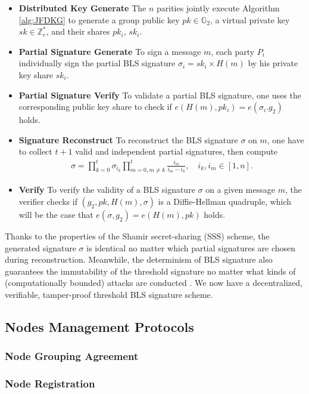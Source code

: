 \documentclass[11pt]{article}
\begin{document}
\begin{itemize}
    \item[] \textbf{Distributed Key Generate} The $n$ parities jointly execute Algorithm \ref{alg:JFDKG} to generate a group public key $pk \in \mathbb{G}_2$, a virtual private key $sk \in \mathbb{Z}_r^*$, and their shares $pk_i$, $sk_i$.
    \item[] \textbf{Partial Signature Generate} To sign a message $m$, each party $P_i$ individually sign the partial BLS signature $\sigma_i=sk_i \times H(m)$ by his private key share $sk_i$.
    \item[] \textbf{Partial Signature Verify} To validate a partial BLS signature, one uses the corresponding public key share to check if $e(H(m),pk_i)=e(\sigma_i.g_2)$ holds.
    \item[] \textbf{Signature Reconstruct} To reconstruct the BLS signature $\sigma$ on $m$, one have to collect $t+1$ valid and independent partial signatures, then compute
    \begin{align*}
        \sigma = \prod_{k=0}^t \sigma_{i_k} \prod_{m=0, m\neq k}^t \frac{i_m}{i_m-i_k},\quad i_k, i_m \in [1,n].
    \end{align*}
    \item[] \textbf{Verify} To verify the validity of a BLS signature $\sigma$ on a given message $m$, the verifier checks if $(g_2,pk,H(m),\sigma)$ is a Diffie-Hellman quadruple, which will be the case that $e(\sigma,g_2)=e(H(m),pk)$ holds.
\end{itemize}

Thanks to the properties of the Shamir secret-sharing (SSS) scheme, the generated signature $\sigma$ is identical no matter which partial signatures are chosen during reconstruction. Meanwhile, the determinism of BLS signature also guarantees the immutability of the threshold signature no matter what kinds of (computationally bounded) attacks are conducted . We now have a decentralized, verifiable, tamper-proof threshold BLS signature scheme.

\subsection{Nodes Management Protocols}

\subsubsection{Node Grouping Agreement}

\subsubsection{Node Registration}
\end{document}
